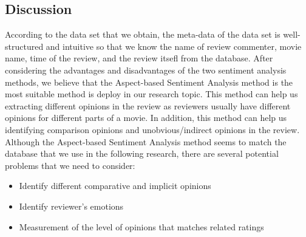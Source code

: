 \documentclass[12pt]{article}
\begin{document}



\subsection{Discussion}
According to the data set that we obtain, the meta-data of the data set is well-structured and intuitive so that we know the name of review commenter, movie name, time of the review, and the review itsefl from the database. After considering the advantages and disadvantages of the two sentiment analysis methods, we believe that the Aspect-based Sentiment Analysis method is the most suitable method is deploy in our research topic. This method can help us extracting different opinions in the review as reviewers usually have different opinions for different parts of a movie. In addition, this method can help us identifying comparison opinions and unobvious/indirect opinions in the review. Although the Aspect-based Sentiment Analysis method seems to match the database that we use in the following research, there are several potential problems that we need to consider:
\begin{itemize}
\item Identify different comparative and implicit opinions
\item Identify reviewer's emotions
\item Measurement of the level of opinions that matches related ratings
\end{itemize}
\end{document}
